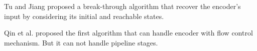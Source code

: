 \documentclass[conference]{IEEEtran}
\begin{document}
Tu and Jiang \cite{TuDAC13} proposed a break-through algorithm 
that recover the encoder's input by considering its initial and reachable states.

Qin et al. \cite{QinTODAES15}
proposed the first algorithm that can handle encoder with flow control mechanism.
But it can not handle pipeline stages.



%
%
%
%
\end{document}
